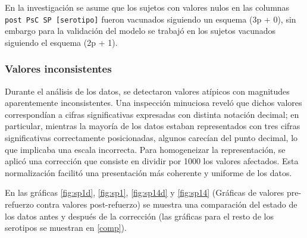 En la investigación se asume que los sujetos con valores nulos en las columnas \texttt{post PsC SP [serotipo]} fueron vacunados siguiendo un esquema (3p + 0), sin embargo para la validación del modelo se trabajó en los sujetos vacunados siguiendo el esquema (2p + 1).

\subsubsection{Valores inconsistentes}
Durante el análisis de los datos, se detectaron valores atípicos con magnitudes aparentemente inconsistentes. Una inspección minuciosa reveló que dichos valores correspondían a cifras significativas expresadas con distinta notación decimal; en particular, mientras la mayoría de los datos estaban representados con tres cifras significativas correctamente posicionadas, algunos carecían del punto decimal, lo que implicaba una escala incorrecta. Para homogeneizar la representación, se aplicó una corrección que consiste en dividir por 1000 los valores afectados. Esta normalización facilitó una presentación más coherente y uniforme de los datos.

En las gráficas \ref{fig:sp1d}, \ref{fig:sp1}, \ref{fig:sp14d} y \ref{fig:sp14} (Gráficas de valores pre-refuerzo contra valores post-refuerzo) se muestra una comparación del estado de los datos antes y después de la corrección (las gráficas para el resto de los serotipos se muestran en \ref{comp}). 


